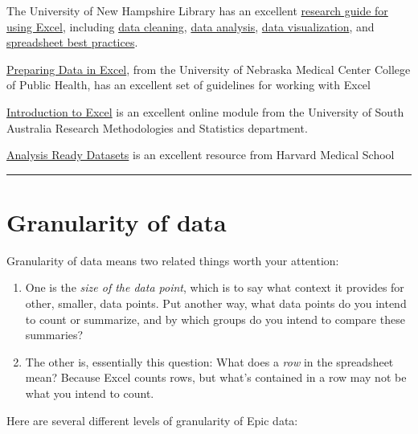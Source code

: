 \documentclass[
  letterpaper,
  DIV=11,
  numbers=noendperiod]{scrreprt}
\begin{document}
The University of New Hampshire Library has an excellent
\href{https://libraryguides.unh.edu/excel}{research guide for using
Excel}, including
\href{https://libraryguides.unh.edu/excel/cleaning}{data cleaning},
\href{https://libraryguides.unh.edu/excel/analysis}{data analysis},
\href{https://libraryguides.unh.edu/excel/visualization}{data
visualization}, and
\href{https://libraryguides.unh.edu/excel/bestpractices}{spreadsheet
best practices}.

\href{https://libraryguides.unh.edu/excel/bestpractices}{Preparing Data
in Excel}, from the University of Nebraska Medical Center College of
Public Health, has an excellent set of guidelines for working with Excel

\href{https://lo.unisa.edu.au/mod/book/view.php?id=646440\&chapterid=164660}{Introduction
to Excel} is an excellent online module from the University of South
Australia Research Methodologies and Statistics department.

\href{https://datamanagement.hms.harvard.edu/analyze/analysis-ready-datasets}{Analysis
Ready Datasets} is an excellent resource from Harvard Medical School

\begin{center}\rule{0.5\linewidth}{0.5pt}\end{center}

\hypertarget{granularity-of-data}{%
\section*{Granularity of data}\label{granularity-of-data}}

Granularity of data means two related things worth your attention:

\begin{enumerate}
\def\labelenumi{\arabic{enumi}.}
\item
  One is the \emph{size of the data point}, which is to say what context
  it provides for other, smaller, data points. Put another way, what
  data points do you intend to count or summarize, and by which groups
  do you intend to compare these summaries?
\item
  The other is, essentially this question: What does a \emph{row} in the
  spreadsheet mean? Because Excel counts rows, but what's contained in a
  row may not be what you intend to count.
\end{enumerate}

Here are several different levels of granularity of Epic data:
\end{document}
